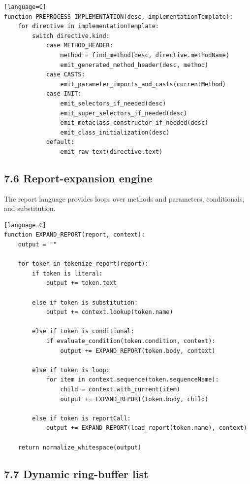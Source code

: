 \documentclass[11pt]{article}
\begin{document}
\begin{verbatim}[language=C]
function PREPROCESS_IMPLEMENTATION(desc, implementationTemplate):
    for directive in implementationTemplate:
        switch directive.kind:
            case METHOD_HEADER:
                method = find_method(desc, directive.methodName)
                emit_generated_method_header(desc, method)
            case CASTS:
                emit_parameter_imports_and_casts(currentMethod)
            case INIT:
                emit_selectors_if_needed(desc)
                emit_super_selectors_if_needed(desc)
                emit_metaclass_constructor_if_needed(desc)
                emit_class_initialization(desc)
            default:
                emit_raw_text(directive.text)
\end{verbatim}

\subsection{7.6 Report-expansion engine}\label{report-expansion-engine}

The report language provides loops over methods and parameters,
conditionals, and substitution.

\begin{verbatim}[language=C]
function EXPAND_REPORT(report, context):
    output = ""

    for token in tokenize_report(report):
        if token is literal:
            output += token.text

        else if token is substitution:
            output += context.lookup(token.name)

        else if token is conditional:
            if evaluate_condition(token.condition, context):
                output += EXPAND_REPORT(token.body, context)

        else if token is loop:
            for item in context.sequence(token.sequenceName):
                child = context.with_current(item)
                output += EXPAND_REPORT(token.body, child)

        else if token is reportCall:
            output += EXPAND_REPORT(load_report(token.name), context)

    return normalize_whitespace(output)
\end{verbatim}

\subsection{7.7 Dynamic ring-buffer
list}\label{dynamic-ring-buffer-list}
\end{document}

